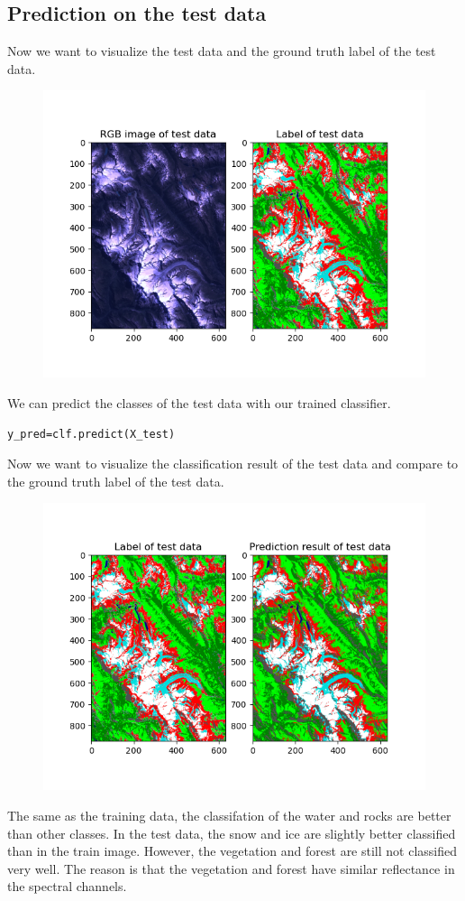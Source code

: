 \documentclass[12pt
,headinclude
,headsepline
,bibtotocnumbered
]{scrartcl}
\begin{document}
\subsection*{Prediction on the test data}
Now we want to visualize the test data and the ground truth label of the test data.
\begin{figure}[H]
\centering
\includegraphics[width=1\textwidth]{plots/test.png}
\end{figure}
We can predict the classes of the test data with our trained classifier.
\begin{lstlisting}[breaklines=true]
    y_pred=clf.predict(X_test)
\end{lstlisting}
Now we want to visualize the classification result of the test data and compare to the ground truth label of the test data.
\begin{figure}[H]
\centering
\includegraphics[width=1\textwidth]{plots/test_result.png}
\end{figure}
The same as the training data, the classifation of the water and rocks are better than other classes. In the test data, the snow and ice are slightly better classified than in the train image. However, the vegetation and forest are still not classified very well. 
The reason is that the vegetation and forest have similar reflectance in the spectral channels.
\end{document}
